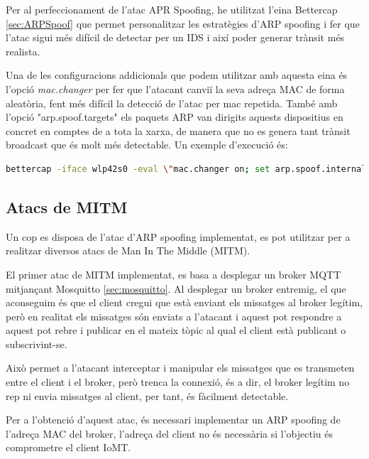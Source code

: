Per al perfeccionament de l'atac APR Spoofing, he utilitzat l'eina Bettercap \ref{sec:ARPSpoof} que permet personalitzar les estratègies d'ARP spoofing i fer que l'atac sigui més difícil de detectar per un IDS i així poder generar trànsit més realista. 

Una de les configuracions addicionals que podem utilitzar amb aquesta eina és l'opció \textit{mac.changer} per fer que l'atacant canviï la seva adreça MAC de forma aleatòria, fent més difícil la detecció de l'atac per mac repetida. També amb l'opció "arp.spoof.targets" els paquets ARP van dirigits aquests dispositius en concret en comptes de a tota la xarxa, de manera que no es genera tant trànsit broadcast que és molt més detectable. Un exemple d'execució és:

\begin{lstlisting}[language=bash, caption={Execució Bettercap}, label=lst:bettercap]
bettercap -iface wlp42s0 -eval \"mac.changer on; set arp.spoof.internal true; set arp.spoof.targets 192.168.0.41,192.168.0.40; arp.spoof on\"
\end{lstlisting}

\subsection{Atacs de MITM}
\label{sec:MITM}
Un cop es disposa de l'atac d'ARP spoofing implementat, es pot utilitzar per a realitzar diversos atacs de Man In The Middle (MITM). 

El primer atac de MITM implementat, es basa a desplegar un broker MQTT mitjançant Mosquitto \ref{sec:mosquitto}. Al desplegar un broker entremig, el que aconseguim és que el client cregui que està enviant els missatges al broker legítim, però en realitat els missatges són enviats a l'atacant i aquest pot respondre a aquest pot rebre i publicar en el mateix tòpic al qual el client està publicant o subscrivint-se.

Això permet a l'atacant interceptar i manipular els missatges que es transmeten entre el client i el broker, però trenca la connexió, és a dir, el broker legítim no rep ni envia missatges al client, per tant, és fàcilment detectable.

Per a l'obtenció d'aquest atac, és necessari implementar un ARP spoofing de l'adreça MAC del broker, l'adreça del client no és necessària si l'objectiu és comprometre el client IoMT. 

